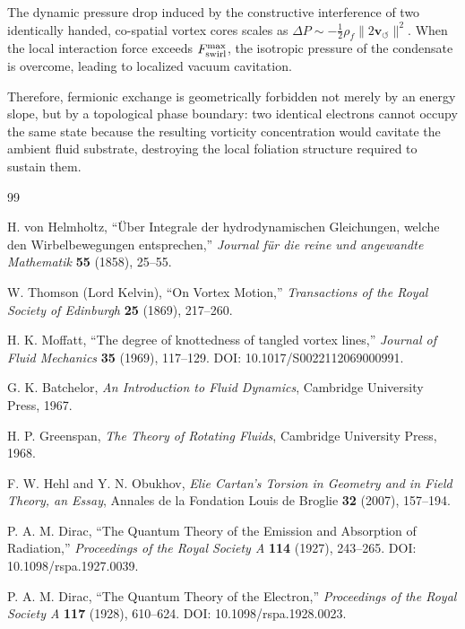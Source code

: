 \documentclass[11pt,a4paper]{article}
\begin{document}
The dynamic pressure drop induced by the constructive interference of two identically handed, co-spatial vortex cores scales as $\Delta P \sim -\frac{1}{2}\rho_{\!f} \lVert 2\mathbf{v}_{\!\boldsymbol{\circlearrowleft}} \rVert^2$. When the local interaction force exceeds $F_{\rm swirl}^{\max}$, the isotropic pressure of the condensate is overcome, leading to localized vacuum cavitation.

Therefore, fermionic exchange is geometrically forbidden not merely by an energy slope, but by a topological phase boundary: two identical electrons cannot occupy the same state because the resulting vorticity concentration would cavitate the ambient fluid substrate, destroying the local foliation structure required to sustain them.

\begin{thebibliography}{99}

H. von Helmholtz,
``Über Integrale der hydrodynamischen Gleichungen, welche den Wirbelbewegungen entsprechen,''
\textit{Journal für die reine und angewandte Mathematik} \textbf{55} (1858), 25--55.

W. Thomson (Lord Kelvin),
``On Vortex Motion,''
\textit{Transactions of the Royal Society of Edinburgh} \textbf{25} (1869), 217--260.

H. K. Moffatt,
``The degree of knottedness of tangled vortex lines,''
\textit{Journal of Fluid Mechanics} \textbf{35} (1969), 117--129.
DOI: 10.1017/S0022112069000991.

G. K. Batchelor,
\textit{An Introduction to Fluid Dynamics},
Cambridge University Press, 1967.

H. P. Greenspan,
\textit{The Theory of Rotating Fluids},
Cambridge University Press, 1968.

F. W. Hehl and Y. N. Obukhov,
\textit{Elie Cartan's Torsion in Geometry and in Field Theory, an Essay},
Annales de la Fondation Louis de Broglie \textbf{32} (2007), 157--194.

P. A. M. Dirac,
``The Quantum Theory of the Emission and Absorption of Radiation,''
\textit{Proceedings of the Royal Society A} \textbf{114} (1927), 243--265.
DOI: 10.1098/rspa.1927.0039.

P. A. M. Dirac,
``The Quantum Theory of the Electron,''
\textit{Proceedings of the Royal Society A} \textbf{117} (1928), 610--624.
DOI: 10.1098/rspa.1928.0023.


\end{thebibliography}
\end{document}
